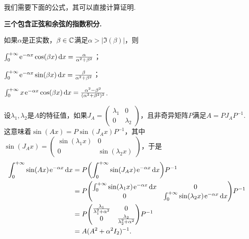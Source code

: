 \begin{solution}
  我们需要下面的公式，其可以直接计算证明.
  \begin{mybox}
    {\bfseries 三个包含正弦和余弦的指数积分.}

    如果$\alpha$是正实数，$\beta\in\mathbb C$满足$\alpha>|\Im(\beta)|$，则
    \begin{enum}
      \item $\int_0^{+\infty}\operatorname{\!\!\;\mathrm e}^{-\alpha x}\cos(\beta x)\mathop{}\!\mathrm d x =\frac\alpha{\alpha^2+\beta^2}$；
      \item $\int_0^{+\infty}\operatorname{\!\!\;\mathrm e}^{-\alpha x}\sin(\beta x)\mathop{}\!\mathrm d x =\frac\beta{\alpha^2+\beta^2}$；
      \item $\int_0^{+\infty}x\operatorname{\!\!\;\mathrm e}^{-\alpha x}\cos(\beta x)\mathop{}\!\mathrm d x =\frac{\alpha^2-\beta^2}{
          (\alpha^2+\beta^2)^2}$.
    \end{enum}
  \end{mybox}

  \begin{inparaenum}[(a)]
    \item 设$\lambda_1,\lambda_2$是$A$的特征值，如果$J_A=\begin{pmatrix}
          \lambda_1 & 0 \\
          0 & \lambda_2
        \end{pmatrix}$，且非奇异矩阵$P$满足$A=PJ_AP^{-1}$. 这意味着$\sin(Ax)=P\sin(J_Ax)P^{-1}$，其中$\sin(J_Ax)=\begin{pmatrix}
          \sin(\lambda_1x) & 0 \\
          0 & \sin(\lambda_2x)
        \end{pmatrix}$，于是
        \begin{align*}
          \int_0^{+\infty}\sin(Ax)\ee^{-\alpha x}\dif x & = P \left( \int_0^{+\infty} \sin(J_Ax) \ee^{-\alpha x} \dif x\right) P^{-1} \\
          & = P \begin{pmatrix}
            \int_0^{+\infty}\sin(\lambda_1x)\ee^{-\alpha x}\dif x & 0 \\
            0 & \int_0^{+\infty}\sin(\lambda_2x)\ee^{-\alpha x}\dif x
          \end{pmatrix} P^{-1} \\
          & = P \begin{pmatrix}
            \frac{\lambda_1}{\lambda_1^2+\alpha^2} & 0 \\
            0 & \frac{\lambda_2}{\lambda_2^2+\alpha^2}
          \end{pmatrix} P^{-1} \\
          & = A(A^2 + \alpha^2I_2)^{-1}.
        \end{align*}


\end{inparaenum}
\end{solution}
